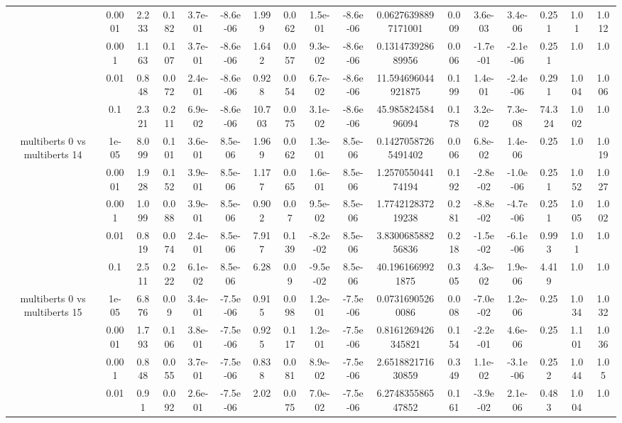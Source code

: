\begin{tabular}{|c|c|c|c|c|c|c|c|c|c|c|c|c|c|c|c|c|}
 & 0.0001 & 2.233 & 0.182 & 3.7e-01 & -8.6e-06 & 1.999 & 0.062 & 1.5e-01 & -8.6e-06 & 0.06276398897171001 & 0.009 & 3.6e-03 & 3.4e-06 & 0.251 & 1.01 & 1.012 \\
 & 0.001 & 1.163 & 0.107 & 3.7e-01 & -8.6e-06 & 1.642 & 0.057 & 9.3e-02 & -8.6e-06 & 0.131473928689956 & 0.006 & -1.7e-01 & -2.1e-06 & 0.251 & 1.0 & 1.0 \\
 & 0.01 & 0.848 & 0.072 & 2.4e-01 & -8.6e-06 & 0.928 & 0.054 & 6.7e-02 & -8.6e-06 & 11.594696044921875 & 0.199 & 1.4e-01 & -2.4e-06 & 0.291 & 1.004 & 1.006 \\
 & 0.1 & 2.321 & 0.211 & 6.9e-02 & -8.6e-06 & 10.703 & 0.075 & 3.1e-02 & -8.6e-06 & 45.98582458496094 & 0.178 & 3.2e-02 & 7.3e-08 & 74.324 & 1.002 & 1.0 \\
\hline
\multirow{5}{*}{multiberts 0 vs multiberts 14} & 1e-05 & 8.099 & 0.101 & 3.6e-01 & 8.5e-06 & 1.969 & 0.062 & 1.3e-01 & 8.5e-06 & 0.14270587265491402 & 0.006 & 6.8e-02 & 1.4e-06 & 0.25 & 1.0 & 1.019 \\
 & 0.0001 & 1.928 & 0.152 & 3.9e-01 & 8.5e-06 & 1.177 & 0.065 & 1.6e-01 & 8.5e-06 & 1.257055044174194 & 0.192 & -2.8e-02 & -1.0e-06 & 0.251 & 1.052 & 1.027 \\
 & 0.001 & 1.099 & 0.088 & 3.9e-01 & 8.5e-06 & 0.902 & 0.07 & 9.5e-02 & 8.5e-06 & 1.774212837219238 & 0.281 & -8.8e-02 & -4.7e-06 & 0.251 & 1.005 & 1.002 \\
 & 0.01 & 0.819 & 0.074 & 2.4e-01 & 8.5e-06 & 7.917 & 0.139 & -8.2e-02 & 8.5e-06 & 3.830068588256836 & 0.218 & -1.5e-02 & -6.1e-06 & 0.993 & 1.01 & 1.0 \\
 & 0.1 & 2.511 & 0.222 & 6.1e-02 & 8.5e-06 & 6.28 & 0.09 & -9.5e-02 & 8.5e-06 & 40.1961669921875 & 0.305 & 4.3e-02 & 1.9e-06 & 4.419 & 1.0 & 1.0 \\
\hline
\multirow{5}{*}{multiberts 0 vs multiberts 15} & 1e-05 & 6.876 & 0.09 & 3.4e-01 & -7.5e-06 & 0.915 & 0.098 & 1.2e-01 & -7.5e-06 & 0.07316905260086 & 0.008 & -7.0e-02 & 1.2e-06 & 0.25 & 1.034 & 1.032 \\
 & 0.0001 & 1.793 & 0.106 & 3.8e-01 & -7.5e-06 & 0.925 & 0.117 & 1.2e-01 & -7.5e-06 & 0.8161269426345821 & 0.154 & -2.2e-01 & 4.6e-06 & 0.25 & 1.101 & 1.036 \\
 & 0.001 & 0.848 & 0.055 & 3.7e-01 & -7.5e-06 & 0.838 & 0.081 & 8.9e-02 & -7.5e-06 & 2.651882171630859 & 0.349 & 1.1e-02 & -3.1e-06 & 0.252 & 1.044 & 1.05 \\
 & 0.01 & 0.91 & 0.092 & 2.6e-01 & -7.5e-06 & 2.02 & 0.075 & 7.0e-02 & -7.5e-06 & 6.274835586547852 & 0.161 & -3.9e-02 & 2.1e-06 & 0.483 & 1.004 & 1.0 \\

\end{tabular}
